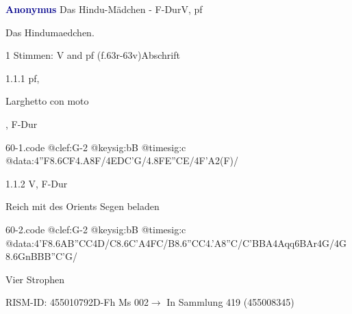 \documentclass[twocolumn, 12pt]{book}
\begin{document}
\par \vspace{16pt} \textcolor{darkblue}{\textbf{Anonymus  }}\hfillplus{\textbf{[60]}}\newline Das Hindu-Mädchen - F-Dur\newline V, pf
\par \begin{itshape}[heading, f.63r:] Das Hindumaedchen.\end{itshape} 
\par \textcolor{darkblue}{}  1 Stimmen: V and pf  (f.63r-63v)\newline Abschrift
\par 1.1.1  pf, \begin{itshape}Larghetto con moto\end{itshape}, F-Dur  
\begin{filecontents*}{60-1.code}
@clef:G-2
@keysig:bB
@timesig:c
@data:4''F{8.6CF}4.A8F/4EDC'G/4.8FE''CE/4F'A2(F)/
\end{filecontents*}
\newline %
\par 1.1.2  V, F-Dur\newline \begin{footnotesize} Reich mit des Orients Segen beladen \end{footnotesize}  
\begin{filecontents*}{60-2.code}
@clef:G-2
@keysig:bB
@timesig:c
@data:4'F{8.6AB}{''CC}4D/C{8.6C'A}4FC/B{8.6''CC}4.'A8''C/C'BBA4Aqq6BAr4G/4G8.6GnB{BB}''C'G/
\end{filecontents*}
\newline %
\par Vier Strophen
\par RISM-ID: 455010792\newline D-Fh  Ms 002\newline $\rightarrow$ In Sammlung 419 (455008345)
      
\end{document}
